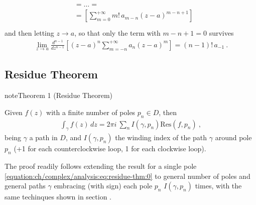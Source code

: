\documentclass[letterpaper,10pt,english]{jupyterBook}
\begin{document}
\begin{itemize}
\begin{equation*}
\begin{split}
\begin{aligned}
    & = \dots = \\
    & = \left[ \sum_{m=0}^{+\infty} m! \, a_{m-n} (z-a)^{m-n+1} \right] \\
  \end{aligned}\end{split}
\end{equation*}
\sphinxAtStartPar
and then letting \(z \rightarrow a\), so that only the term with \(m-n+1 = 0\) survives
\begin{equation*}
\begin{split}\lim_{z \rightarrow a} \frac{d^{n-1}}{dz^{n-1}} \left[ (z-a)^n \sum_{m=-n}^{+\infty} a_n (z-a)^m \right] = (n-1)! \, a_{-1} \ .\end{split}
\end{equation*}
\end{itemize}


\subsection{Residue Theorem}
\label{\detokenize{ch/complex/analysis:residue-theorem}}\label{\detokenize{ch/complex/analysis:complex-analysis-mero-fun-residues-thm}}\label{ch/complex/analysis:theorem-6}
\begin{sphinxadmonition}{note}{Theorem 1 (Residue Theorem)}



\sphinxAtStartPar
Given \(f(z)\) with a finite number of poles \(p_n \in D\), then
\begin{equation*}
\begin{split}\int_{\gamma} f(z) \, dz = 2 \pi i \ \sum_{n} I(\gamma, p_n) \text{Res}(f,p_n) \ ,\end{split}
\end{equation*}
\sphinxAtStartPar
being \(\gamma\) a path in \(D\), and \(I(\gamma, p_n)\) the winding index of the path \(\gamma\) around pole \(p_n\) (+1 for each counter\sphinxhyphen{}clockwise loop, \sphinxhyphen{}1 for each clockwise loop).
\end{sphinxadmonition}

\sphinxAtStartPar
The proof readily follows extending the result for a single pole \eqref{equation:ch/complex/analysis:eq:residue-thm:0} to general number of poles and general paths \(\gamma\) embracing (with sign) each pole \(p_n\) \(I(\gamma,p_n)\) times, with the same techinques shown in section {\hyperref[\detokenize{ch/complex/analysis:complex-analysis-useful-int-path-independence-sum}]{}}.
\end{document}
